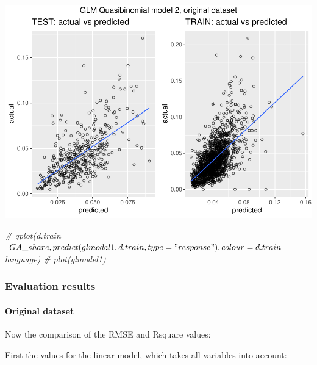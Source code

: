 \documentclass[
]{article}
\newenvironment{Shaded}{\begin{snugshade}}{\end{snugshade}}
\newcommand{\CommentTok}[1]{\textcolor[rgb]{0.56,0.35,0.01}{\textit{#1}}}
\begin{document}
\includegraphics{Lin_Mod_Clus_Analysis_files/figure-latex/unnamed-chunk-36-1.pdf}

\begin{Shaded}
\begin{Highlighting}[]
\CommentTok{\# qplot(d.train$GA\_share, predict(glmodel1, d.train, type="response"), colour = d.train$language)}
\CommentTok{\# plot(glmodel1)}
\end{Highlighting}
\end{Shaded}

\hypertarget{evaluation-results}{%
\subsubsection{Evaluation results}\label{evaluation-results}}

\hypertarget{original-dataset-1}{%
\paragraph{Original dataset}\label{original-dataset-1}}

Now the comparison of the RMSE and Rsquare values:

First the values for the linear model, which takes all variables into
account:
\end{document}
